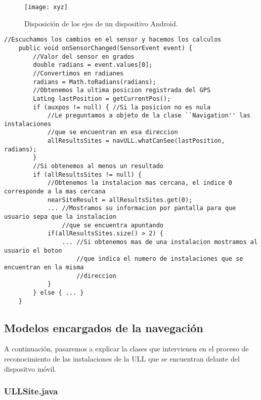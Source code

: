 \begin{figure}[h]
    \centering
    \texttt{[image: xyz]}
    \caption{Disposición de los ejes de un dispositivo Android.}
    \label{fig:xyz}
\end{figure}    

\begin{minipage}{\linewidth}
\begin{lstlisting}[caption={Código que se ejecuta cada vez que se registra un cambio en el sensor que calcula la orientacion.}, label={lst:orientacionL}]
    //Escuchamos los cambios en el sensor y hacemos los calculos
    public void onSensorChanged(SensorEvent event) {
        //Valor del sensor en grados
        double radians = event.values[0]; 
        //Convertimos en radianes
        radians = Math.toRadians(radians);
        //Obtenemos la ultima posicion registrada del GPS
        LatLng lastPosition = getCurrentPos();
        if (auxpos != null) { //Si la posicion no es nula
            //Le preguntamos a objeto de la clase ``Navigation'' las instalaciones 
            //que se encuentran en esa direccion
            allResultsSites = navULL.whatCanSee(lastPosition, radians);
        }
        //Si obtenemos al menos un resultado
        if (allResultsSites != null) {
            //Obtenemos la instalacion mas cercana, el indice 0 corresponde a la mas cercana
            nearSiteResult = allResultsSites.get(0);
            ... //Mostramos su informacion por pantalla para que usuario sepa que la instalacion  
                //que se encuentra apuntando
            if(allResultsSites.size() > 2) {
                ... //Si obtenemos mas de una instalacion mostramos al usuario el boton
                    //que indica el numero de instalaciones que se encuentran en la misma
                    //direccion 
            }
        } else { ... }
    } 
\end{lstlisting}
\end{minipage}

\subsection{Modelos encargados de la navegación}

A continuación, pasaremos a explicar la clases que intervienen en el proceso de reconocimiento de las instalaciones de la ULL que se encuentran delante del dispositvo móvil.

\subsubsection{ULLSite.java}


